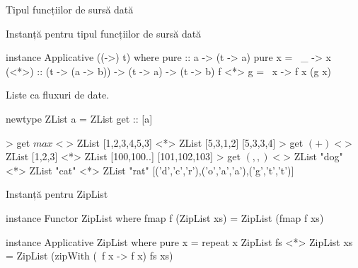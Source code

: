 \documentclass[xcolor=pdftex,romanian,colorlinks]{beamer}
\begin{document}
\begin{frame}[fragile]{Tipul funcțiilor de sursă dată}

\begin{block}{Instanță pentru tipul funcțiilor de sursă dată}
\vspace{-2ex}
\begin{asciihs}
instance Applicative ((->) t) where
  pure :: a -> (t -> a)
  pure x = \ _ -> x
  (<*>) :: (t -> (a -> b)) -> (t -> a) -> (t -> b)
  f  <*> g = \ x -> f x (g x)
\end{asciihs}
\end{block}

\end{frame}

\begin{frame}[fragile]{Liste ca fluxuri de date.}
\begin{asciihs}
newtype ZList a = ZList { get :: [a]}
\end{asciihs}
\begin{asciihs}
> get $ max <$> ZList [1,2,3,4,5,3] <*> ZList [5,3,1,2]  
[5,3,3,4]  
> get $ (+) <$> ZList [1,2,3] <*> ZList [100,100..]  
[101,102,103]  
> get $ (,,) <$> ZList "dog" <*> ZList "cat" <*> ZList "rat"  
[('d','c','r'),('o','a','a'),('g','t','t')]  
\end{asciihs}


\begin{block}{Instanță pentru ZipList}
\vspace{-2ex}
\begin{asciihs}
instance Functor ZipList where
  fmap f (ZipList xs) = ZipList (fmap f xs)
  
instance Applicative ZipList where
  pure x = repeat x
  ZipList fs <*> ZipList xs = 
    ZipList (zipWith (\ f x -> f x) fs xs)
\end{asciihs}
\end{block}


\end{frame}
\end{document}
